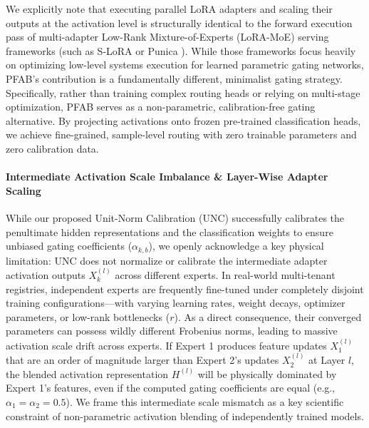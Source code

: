 We explicitly note that executing parallel LoRA adapters and scaling their outputs at the activation level is structurally identical to the forward execution pass of multi-adapter Low-Rank Mixture-of-Experts (LoRA-MoE) serving frameworks (such as S-LoRA \cite{s_lora2024} or Punica \cite{punica2023}). While those frameworks focus heavily on optimizing low-level systems execution for learned parametric gating networks, \textsc{PFAB}'s contribution is a fundamentally different, minimalist gating strategy. Specifically, rather than training complex routing heads or relying on multi-stage optimization, \textsc{PFAB} serves as a non-parametric, calibration-free gating alternative. By projecting activations onto frozen pre-trained classification heads, we achieve fine-grained, sample-level routing with zero trainable parameters and zero calibration data.

\paragraph{Intermediate Activation Scale Imbalance \& Layer-Wise Adapter Scaling}
While our proposed Unit-Norm Calibration (UNC) successfully calibrates the penultimate hidden representations and the classification weights to ensure unbiased gating coefficients ($\alpha_{k, b}$), we openly acknowledge a key physical limitation: UNC does not normalize or calibrate the intermediate adapter activation outputs $X_k^{(l)}$ across different experts. In real-world multi-tenant registries, independent experts are frequently fine-tuned under completely disjoint training configurations—with varying learning rates, weight decays, optimizer parameters, or low-rank bottlenecks ($r$). As a direct consequence, their converged parameters can possess wildly different Frobenius norms, leading to massive activation scale drift across experts. If Expert 1 produces feature updates $X_1^{(l)}$ that are an order of magnitude larger than Expert 2's updates $X_2^{(l)}$ at Layer $l$, the blended activation representation $H^{(l)}$ will be physically dominated by Expert 1's features, even if the computed gating coefficients are equal (e.g., $\alpha_1 = \alpha_2 = 0.5$). We frame this intermediate scale mismatch as a key scientific constraint of non-parametric activation blending of independently trained models.

